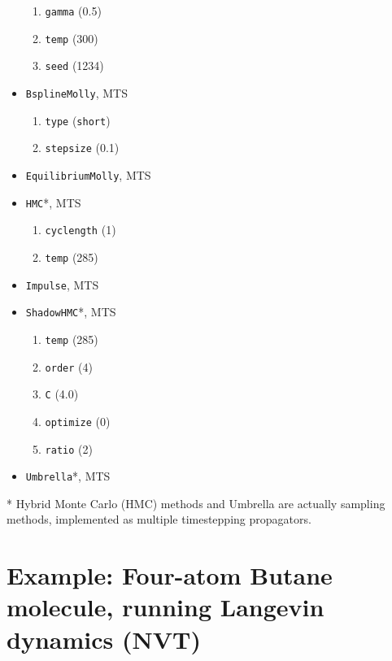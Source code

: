 \documentclass[11pt]{report}
\begin{document}
\begin{itemize}
\begin{enumerate}
\item \texttt{gamma} (0.5)
\item \texttt{temp} (300)
\item \texttt{seed} (1234)
\end{enumerate}
\item \texttt{BsplineMolly}, MTS
\begin{enumerate}
\item \texttt{type} (\texttt{short})
\item \texttt{stepsize} (0.1)
\end{enumerate}
\item \texttt{EquilibriumMolly}, MTS
\item \texttt{HMC}*, MTS
\begin{enumerate}
\item \texttt{cyclength} (1)
\item \texttt{temp} (285)
\end{enumerate}
\item \texttt{Impulse}, MTS
\item \texttt{ShadowHMC}*, MTS
\begin{enumerate}
\item \texttt{temp} (285)
\item \texttt{order} (4)
\item \texttt{C} (4.0)
\item \texttt{optimize} (0)
\item \texttt{ratio} (2)
\end{enumerate}
\item \texttt{Umbrella}*, MTS
\end{itemize}

* Hybrid Monte Carlo (HMC) methods and Umbrella are actually
sampling methods, implemented as multiple timestepping propagators.

\newpage
\section{Example: Four-atom Butane molecule, running Langevin dynamics (NVT)}
\end{document}
